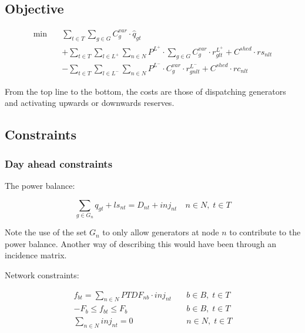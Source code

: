 \documentclass[number,times]{elsarticle}
\begin{document}
\subsection{Objective}

\begin{align}
    \min \quad & \sum_{t \in T} \sum_{g \in G} C^{var}_{g} \cdot \hat{q}_{gt} \nonumber                                                                  \\
               & + \sum_{t \in T} \sum_{l \in L^+} \sum_{n \in N} P^{L^+} \cdot \sum_{g \in G} C^{var}_{g} \cdot r^{L^+}_{glt} + C^{shed} \cdot rs_{nlt} \\
               & - \sum_{t \in T} \sum_{l \in L^-} \sum_{n \in N} P^{L^-} \cdot C^{var}_{g} \cdot r^{L^-}_{gnlt} + C^{shed} \cdot rc_{nlt} \nonumber
\end{align}

From the top line to the bottom, the costs are those of dispatching generators and activating upwards or downwards reserves.

\subsection{Constraints}

\subsubsection{Day ahead constraints}

The power balance:

\begin{equation}
    \sum_{g \in G_n} q_{gt} + ls_{nt} = D_{nt} + inj_{nt} \quad n \in N, \; t \in T
\end{equation}

Note the use of the set $G_n$ to only allow generators at node $n$ to contribute to the power balance. Another way of describing this would have been through an incidence matrix.

Network constraints:

\begin{align}
    f_{bt} = \sum_{n \in N} PTDF_{nb} \cdot inj_{nt} & \quad b \in B, \; t \in T \\
    -F_b \leq f_{bt} \leq F_b                        & \quad b \in B, \; t \in T \\
    \sum_{n \in N} inj_{nt} = 0                      & \quad n \in N, \; t \in T \\
\end{align}
\end{document}
